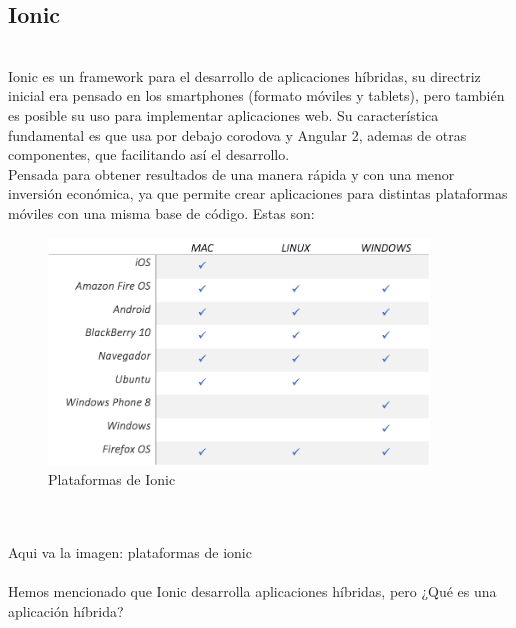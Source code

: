 \documentclass[a4paper, 11pt]{article}
\begin{document}
\begin{itemize}

        \subsection{Ionic}\\

            Ionic es un framework para el desarrollo de aplicaciones híbridas,
            su directriz inicial era pensado en los smartphones (formato móviles y
            tablets), pero también es posible su uso para implementar aplicaciones
            web. Su característica fundamental es que usa por debajo corodova y
            Angular 2, ademas de otras componentes, que facilitando así el
            desarrollo.\\

            Pensada para obtener resultados de una manera rápida y con una menor
            inversión económica, ya que permite crear aplicaciones para distintas
            plataformas móviles con una misma base de código. Estas son:\\

                      \begin{figure}[H]
                        \centering
                        \includegraphics[width=0.9\textwidth]{tablaPlataformasIonic}
                        \caption{Plataformas de Ionic}
                        \label{f:plataformas}
                      \end{figure}
                      \\\\\textcolor[rgb]{1,0,0}{Aqui va la imagen: plataformas de ionic}\\\\

            Hemos mencionado que Ionic desarrolla aplicaciones híbridas, pero ¿Qué
            es una aplicación híbrida?\\


\end{itemize}
\end{document}
